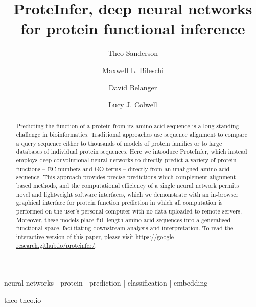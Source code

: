 \title{ProteInfer, deep neural networks for protein functional inference}
\author[*,1,\Letter]{Theo Sanderson}
\author[*,2]{Maxwell L. Bileschi}
\author[2]{David Belanger}
\author[2]{Lucy J. Colwell}




\maketitle



\begin{abstract}
  Predicting the function of a protein from its amino acid sequence is a long-standing challenge in bioinformatics. Traditional approaches use sequence alignment to compare a query sequence either to thousands of models of protein families or to large databases of individual protein sequences. Here we introduce ProteInfer, which instead employs deep convolutional neural networks to directly predict a variety of protein functions -- EC numbers and GO terms -- directly from an unaligned amino acid sequence. This approach provides precise predictions which complement alignment-based methods, and the computational efficiency of a single neural network permits novel and lightweight software interfaces, which we demonstrate with an in-browser graphical interface for protein function prediction in which all computation is performed on the user's personal computer with no data uploaded to remote servers. Moreover, these models place full-length amino acid sequences into a generalised functional space, facilitating downstream analysis and interpretation. To read the interactive version of this paper, please visit \url{https://google-research.github.io/proteinfer/}.
\end {abstract}

\begin{keywords}
neural networks | protein | prediction | classification | embedding
\end{keywords}


\begin{corrauthor}
theo \at \;theo.io
\end{corrauthor}

